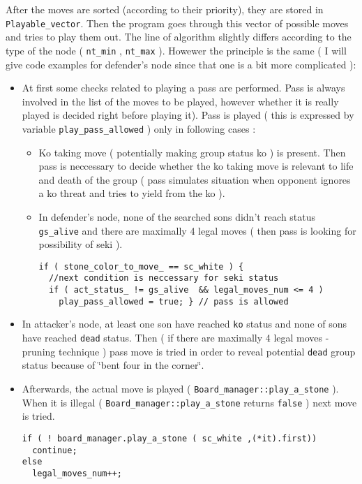 After the moves are sorted (according to their priority), they are stored in {\tt Playable\_\-vector}. Then the program goes through this vector of possible moves and tries to play them out. The line of algorithm slightly differs according to the type of the node ( {\tt nt\_\-min} , {\tt nt\_\-max} ). Howewer the principle is the same ( I will give code examples for defender's node since that one is a bit more complicated ):\begin{itemize}
\item At first some checks related to playing a pass are performed. Pass is always involved in the list of the moves to be played, however whether it is really played is decided right before playing it). Pass is played ( this is expressed by variable {\tt play\_\-pass\_\-allowed} ) only in following cases :\begin{itemize}
\item Ko taking move ( potentially making group status ko ) is present. Then pass is neccessary to decide whether the ko taking move is relevant to life and death of the group ( pass simulates situation when opponent ignores a ko threat and tries to yield from the ko ).\item In defender's node, none of the searched sons didn't reach status {\tt gs\_\-alive} and there are maximally 4 legal moves ( then pass is looking for possibility of seki ). 

\footnotesize\begin{verbatim}if ( stone_color_to_move_ == sc_white ) { 
  //next condition is neccessary for seki status 
  if ( act_status_ != gs_alive  && legal_moves_num <= 4 )
    play_pass_allowed = true; } // pass is allowed
\end{verbatim}
\normalsize
\end{itemize}
\end{itemize}


\begin{itemize}
\item In attacker's node, at least one son have reached {\tt ko} status and none of sons have reached {\tt dead} status. Then ( if there are maximally 4 legal moves - pruning technique ) pass move is tried in order to reveal potential {\tt dead} group status because of \char`\"{}bent four in the corner\char`\"{}.\end{itemize}


\begin{itemize}
\item Afterwards, the actual move is played ( {\tt Board\_\-manager::play\_\-a\_\-stone} ). When it is illegal ( {\tt Board\_\-manager::play\_\-a\_\-stone} returns {\tt false} ) next move is tried. 

\footnotesize\begin{verbatim}if ( ! board_manager.play_a_stone ( sc_white ,(*it).first)) 
  continue; 
else
  legal_moves_num++;
\end{verbatim}
\normalsize
\end{itemize}



